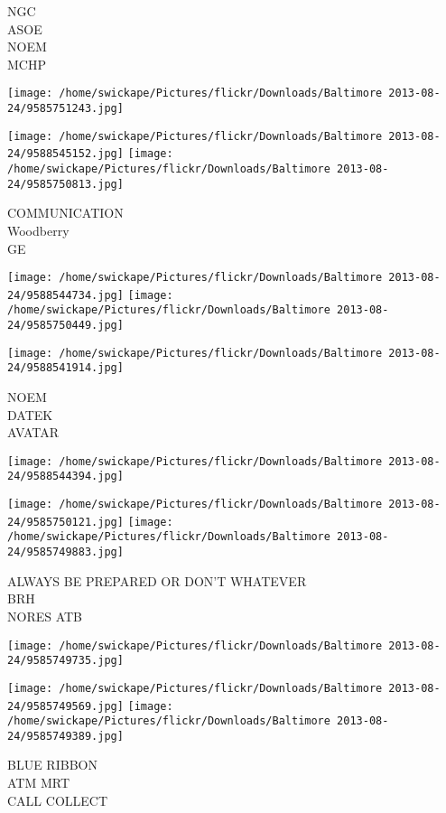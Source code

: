 \documentclass[10pt,letterpaper]{article}
\begin{document}
NGC\\
ASOE\\
NOEM\\
MCHP
\pagebreak

\texttt{[image: /home/swickape/Pictures/flickr/Downloads/Baltimore 2013-08-24/9585751243.jpg]}

\vspace{0.25in}
\texttt{[image: /home/swickape/Pictures/flickr/Downloads/Baltimore 2013-08-24/9588545152.jpg]}
\texttt{[image: /home/swickape/Pictures/flickr/Downloads/Baltimore 2013-08-24/9585750813.jpg]}

COMMUNICATION\\
Woodberry\\
GE
\pagebreak

\texttt{[image: /home/swickape/Pictures/flickr/Downloads/Baltimore 2013-08-24/9588544734.jpg]}
\texttt{[image: /home/swickape/Pictures/flickr/Downloads/Baltimore 2013-08-24/9585750449.jpg]}

\texttt{[image: /home/swickape/Pictures/flickr/Downloads/Baltimore 2013-08-24/9588541914.jpg]}

NOEM\\
DATEK\\
AVATAR
\pagebreak

\texttt{[image: /home/swickape/Pictures/flickr/Downloads/Baltimore 2013-08-24/9588544394.jpg]}

\vspace{0.25in}
\texttt{[image: /home/swickape/Pictures/flickr/Downloads/Baltimore 2013-08-24/9585750121.jpg]}
\texttt{[image: /home/swickape/Pictures/flickr/Downloads/Baltimore 2013-08-24/9585749883.jpg]}

ALWAYS BE PREPARED OR DON'T WHATEVER\\
BRH\\
NORES ATB
\pagebreak

\texttt{[image: /home/swickape/Pictures/flickr/Downloads/Baltimore 2013-08-24/9585749735.jpg]}

\vspace{0.25in}
\texttt{[image: /home/swickape/Pictures/flickr/Downloads/Baltimore 2013-08-24/9585749569.jpg]}
\texttt{[image: /home/swickape/Pictures/flickr/Downloads/Baltimore 2013-08-24/9585749389.jpg]}

BLUE RIBBON\\
ATM MRT\\
CALL COLLECT
\pagebreak
\end{document}
